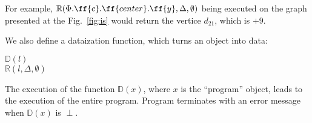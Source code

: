 For example, $\mathbb{R}(\Phi.\ff{c}.\ff{center}.\ff{y},
\Delta, \emptyset)$ being executed on the graph presented at the
Fig.~\ref{fig:is} would return the vertice $d_{21}$, which is $+9$.

We also define a dataization function, which turns an object into data:

\begin{algo}
 $\mathbb{D}(l)$ \\
  \tab {} $\mathbb{R}(l, \Delta, \emptyset)$ \\
\end{algo}

The execution of the function $\mathbb{D}(x)$, where $x$ is the
``program'' object, leads to the execution of the entire program.
Program terminates with an error message when $\mathbb{D}(x)$ is $\perp$.

